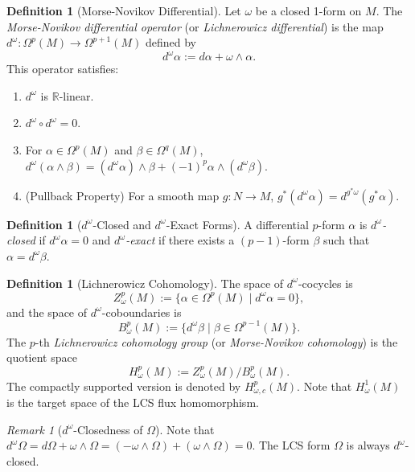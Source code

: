 \documentclass[11pt,a4paper]{amsart}
\theoremstyle{definition}
\newtheorem{definition}[theorem]{Definition}
\theoremstyle{remark}
\newtheorem{remark}[theorem]{Remark}
\begin{document}
	\begin{definition}[Morse-Novikov Differential]
		Let $\omega$ be a closed 1-form on $M$. The \emph{Morse-Novikov differential operator} (or \emph{Lichnerowicz differential}) is the map $d^\omega : \Omega^p(M) \to \Omega^{p+1}(M)$ defined by
		\[
		d^\omega \alpha := d\alpha + \omega \wedge \alpha.
		\]
		This operator satisfies:
		\begin{enumerate}
			\item $d^\omega$ is $\mathbb{R}$-linear.
			\item $d^\omega \circ d^\omega = 0$.
			\item For $\alpha \in \Omega^p(M)$ and $\beta \in \Omega^q(M)$, $d^\omega(\alpha \wedge \beta) = (d^\omega \alpha) \wedge \beta + (-1)^p \alpha \wedge (d^\omega \beta)$.
			\item (Pullback Property) For a smooth map $g : N \to M$, $g^*(d^\omega \alpha) = d^{g^*\omega}(g^*\alpha)$.
		\end{enumerate}
	\end{definition}
	
	\begin{definition}[$d^\omega$-Closed and $d^\omega$-Exact Forms]
		A differential $p$-form $\alpha$ is \emph{$d^\omega$-closed} if $d^\omega \alpha = 0$ and \emph{$d^\omega$-exact} if there exists a $(p-1)$-form $\beta$ such that $\alpha = d^\omega \beta$.
	\end{definition}
	
	\begin{definition}[Lichnerowicz Cohomology]
		The space of $d^\omega$-cocycles is
		\[
		Z_\omega^p(M) := \{ \alpha \in \Omega^p(M) \mid d^\omega \alpha = 0 \},
		\]
		and the space of $d^\omega$-coboundaries is
		\[
		B_\omega^p(M) := \{ d^\omega \beta \mid \beta \in \Omega^{p-1}(M) \}.
		\]
		The $p$-th \emph{Lichnerowicz cohomology group} (or \emph{Morse-Novikov cohomology}) is the quotient space
		\[
		H_\omega^p(M) := Z_\omega^p(M) / B_\omega^p(M).
		\]
		The compactly supported version is denoted by $H_{\omega,c}^p(M)$. Note that $H_\omega^1(M)$ is the target space of the LCS flux homomorphism.
	\end{definition}
	
	\begin{remark}[$d^\omega$-Closedness of $\Omega$]
		Note that $d^\omega \Omega = d\Omega + \omega \wedge \Omega = (-\omega \wedge \Omega) + (\omega \wedge \Omega) = 0$. The LCS form $\Omega$ is always $d^\omega$-closed.
	\end{remark}
	
\end{document}
